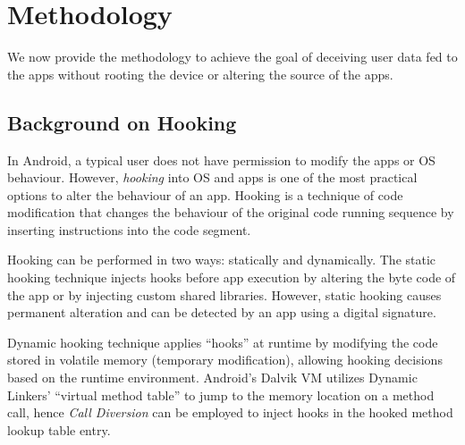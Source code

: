 \newpage
\section{\framework{} Methodology}
\label{sec:methodology}

We now provide the methodology to achieve the goal of deceiving user data fed to the apps without rooting the device or altering the source of the apps.

\subsection{Background on Hooking}
In Android, a typical user does not have permission to modify the apps or OS behaviour. However, \textit{hooking} into OS and apps is one of the most practical options to alter the behaviour of an app. Hooking is a technique of code modification that changes the behaviour of the original code running sequence by inserting instructions into the code segment. 

Hooking can be performed in two ways: statically and dynamically. The static hooking technique injects hooks before app execution by altering the byte code of the app or by injecting custom shared libraries. However, static hooking causes permanent alteration and can be detected by an app using a digital signature. 

Dynamic hooking technique applies ``hooks'' at runtime by modifying the code stored in volatile memory (temporary modification), allowing hooking decisions based on the runtime environment. Android's Dalvik VM utilizes Dynamic Linkers' ``virtual method table'' to jump to the memory location on a method call, hence \textit{Call Diversion} can be employed to inject hooks in the hooked method lookup table entry. 

